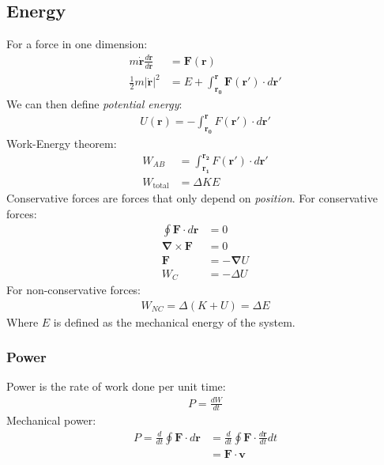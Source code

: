 \documentclass[11pt, letterpaper]{article}
\newcommand{\ve}[1]{
  \ensuremath{\bm{#1}}}	               %
\begin{document}
\begin{multicols*}{3}
\subsection{Energy}
For a force in one dimension:
\begin{align*}
  m \dot{\ve{r}} \frac{d\dot{\ve{r}}}{d\ve{r}} &= \ve{F}(\ve{r}) \\
  \frac{1}{2}m |\dot{\ve{r}}|^2 &= E + \int_{\ve{r_0}}^{\ve{r}} \ve{F}(\ve{r}') \cdot d\ve{r}'
\end{align*}
We can then define \emph{potential energy}:
\begin{align*}
  U(\ve{r}) = - \int_{\ve{r_0}}^{\ve{r}} F(\ve{r}') \cdot d\ve{r}' 
\end{align*}
Work-Energy theorem:
\begin{align*}
  W_{AB} &= \int_{\ve{r_1}}^{\ve{r_2}} F(\ve{r}') \cdot d\ve{r}' \\
  W_{\text{total}} &= \Delta KE
\end{align*}
Conservative forces are forces that only depend on {\em position}. For conservative forces:
\begin{align*}
  \oint \ve{F} \cdot d\ve{r} &= 0 \\
  \ve{\nabla} \times \ve{F} &= 0 \\
  \ve{F} &= - \ve{\nabla} U \\
  W_{C} &= -\Delta U
\end{align*}
For non-conservative forces:
\begin{align*}
  W_{NC} = \Delta(K+U) = \Delta E
\end{align*}
Where $E$ is defined as the mechanical energy of the system.
\subsubsection{Power}
Power is the rate of work done per unit time:
\begin{align*}
  P=\frac{dW}{dt}
\end{align*}
Mechanical power:
\begin{align*}
  P=\frac{d}{dt}\oint \ve{F} \cdot d\ve{r}&=\frac{d}{dt}\oint \ve{F} \cdot \frac{d\ve{r}}{dt} dt\\
  &=\ve{F} \cdot \ve{v}
\end{align*}

\end{multicols*}
\end{document}
